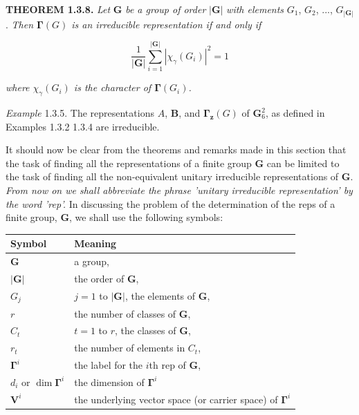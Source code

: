 \documentclass[11pt,a4paper,twoside,openright]{book}
\begin{document}
\textbf{THEOREM 1.3.8.} \textit{Let} $\mathbf{G}$ \textit{be a group of order} $|\mathbf{G}|$ \textit{with elements} $G_{1}$, $G_{2}$, ..., $G_{|\mathbf{G}|}$. \textit{Then $\boldsymbol{\Gamma}(G)$ is an irreducible representation if and only if}

\begin{equation*}
\frac{1}{|\mathbf{G}|}\sum_{i=1}^{|\mathbf{G}|} |\chi_{\gamma}(G_{i})|^{2} = 1 \tag{1.3.11}
\end{equation*}

\textit{where $\chi_{\gamma}(G_{i})$ is the character of $\boldsymbol{\Gamma}(G_{i})$.}

\textit{Example} 1.3.5. The representations $A$, $\mathbf{B}$, and $\boldsymbol{\Gamma}_{\mathbf{z}}(G)$ of $\mathbf{G}_6^2$, as defined in Examples 1.3.2 1.3.4  are irreducible.

It should now be clear from the theorems and remarks made in this section that the task of finding all the representations of a finite group $\mathbf{G}$ can be limited to the task of finding all the non-equivalent unitary irreducible representations of $\mathbf{G}$. \textit{From now on we shall abbreviate the phrase 'unitary irreducible representation' by the word 'rep'.} In discussing the problem of the determination of the reps of a finite group, $\mathbf{G}$, we shall use the following symbols:

\begin{tabular}{|p{}|p{}|}
\hline
Symbol & Meaning \\ \hline
$\mathbf{G}$ & a group, \\ \hline
$|\mathbf{G}|$ & the order of $\mathbf{G}$, \\ \hline
$G_{j}$ & $j = 1$ to $|\mathbf{G}|$, the elements of $\mathbf{G}$, \\ \hline
$r$ & the number of classes of $\mathbf{G}$, \\ \hline
$C_{t}$ & $t = 1$ to $r$, the classes of $\mathbf{G}$, \\ \hline
$r_{t}$ & the number of elements in $C_{t}$, \\ \hline
$\boldsymbol{\Gamma}^{i}$ & the label for the $i$th rep of $\mathbf{G}$, \\ \hline
$d_{i}$ or $\dim \boldsymbol{\Gamma}^{i}$ & the dimension of $\boldsymbol{\Gamma}^{i}$ \\ \hline
$\mathbf{V}^{i}$ & the underlying vector space (or carrier space) of $\boldsymbol{\Gamma}^{i}$ \\ \hline
\end{tabular}
\medskip
\end{document}
